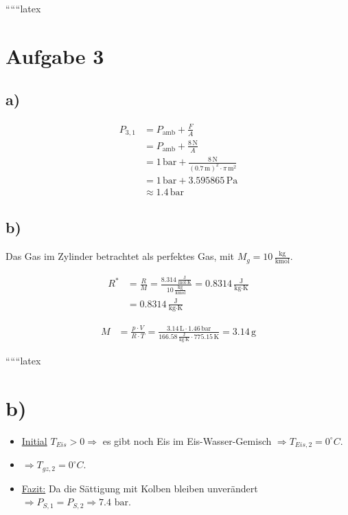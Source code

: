
``````latex

\section*{Aufgabe 3}

\subsection*{a)}

\begin{align*}
P_{3,1} &= P_{\text{amb}} + \frac{F}{A} \\
        &= P_{\text{amb}} + \frac{8 \, \text{N}}{A} \\
        &= 1 \, \text{bar} + \frac{8 \, \text{N}}{(0.7 \, \text{m})^2 \cdot \pi \, \text{m}^2} \\
        &= 1 \, \text{bar} + 3.595865 \, \text{Pa} \\
        &\approx 1.4 \, \text{bar}
\end{align*}

\subsection*{b)}

Das Gas im Zylinder betrachtet als perfektes Gas, mit $M_g = 10 \, \frac{\text{kg}}{\text{kmol}}$.

\begin{align*}
R^* &= \frac{R}{M} = \frac{8.314 \, \frac{\text{J}}{\text{mol} \cdot \text{K}}}{10 \, \frac{\text{kg}}{\text{kmol}}} = 0.8314 \, \frac{\text{J}}{\text{kg} \cdot \text{K}} \\
    &= 0.8314 \, \frac{\text{J}}{\text{kg} \cdot \text{K}}
\end{align*}

\begin{align*}
M &= \frac{p \cdot V}{R \cdot T} = \frac{3.14 \, \text{L} \cdot 1.46 \, \text{bar}}{166.58 \, \frac{\text{J}}{\text{kg} \cdot \text{K}} \cdot 775.15 \, \text{K}} = 3.14 \, \text{g}
\end{align*}

``````latex


\section*{b)}

\begin{itemize}
    \item \underline{Initial} $T_{Eis} > 0 \Rightarrow$ es gibt noch Eis im Eis-Wasser-Gemisch $\Rightarrow T_{Eis,2} = 0^\circ C$.
    \item $\Rightarrow T_{gz,2} = 0^\circ C$.
    \item \underline{Fazit:} Da die Sättigung mit Kolben bleiben unverändert $\Rightarrow P_{S,1} = P_{S,2} \Rightarrow 7.4 \text{ bar}$.
\end{itemize}

